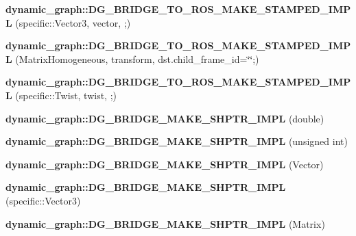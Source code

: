 \begin{DoxyCompactItemize}
{\bfseries dynamic\+\_\+graph\+::\+D\+G\+\_\+\+B\+R\+I\+D\+G\+E\+\_\+\+T\+O\+\_\+\+R\+O\+S\+\_\+\+M\+A\+K\+E\+\_\+\+S\+T\+A\+M\+P\+E\+D\+\_\+\+I\+M\+PL} (specific\+::\+Vector3, vector, ;)
\item 
\mbox{\label{namespacedynamic__graph_a612d5b355619bf2e6aaa3be10d400882}} 
{\bfseries dynamic\+\_\+graph\+::\+D\+G\+\_\+\+B\+R\+I\+D\+G\+E\+\_\+\+T\+O\+\_\+\+R\+O\+S\+\_\+\+M\+A\+K\+E\+\_\+\+S\+T\+A\+M\+P\+E\+D\+\_\+\+I\+M\+PL} (Matrix\+Homogeneous, transform, dst.\+child\+\_\+frame\+\_\+id=\char`\"{}\char`\"{};)
\item 
\mbox{\label{namespacedynamic__graph_a7057c2853072917bd1ff399eccc66bb1}} 
{\bfseries dynamic\+\_\+graph\+::\+D\+G\+\_\+\+B\+R\+I\+D\+G\+E\+\_\+\+T\+O\+\_\+\+R\+O\+S\+\_\+\+M\+A\+K\+E\+\_\+\+S\+T\+A\+M\+P\+E\+D\+\_\+\+I\+M\+PL} (specific\+::\+Twist, twist, ;)
\item 
\mbox{\label{namespacedynamic__graph_ae22a330aece4dccbed6a8e24ac897223}} 
{\bfseries dynamic\+\_\+graph\+::\+D\+G\+\_\+\+B\+R\+I\+D\+G\+E\+\_\+\+M\+A\+K\+E\+\_\+\+S\+H\+P\+T\+R\+\_\+\+I\+M\+PL} (double)
\item 
\mbox{\label{namespacedynamic__graph_a6f98ec6c1978860a339800f794b86c6a}} 
{\bfseries dynamic\+\_\+graph\+::\+D\+G\+\_\+\+B\+R\+I\+D\+G\+E\+\_\+\+M\+A\+K\+E\+\_\+\+S\+H\+P\+T\+R\+\_\+\+I\+M\+PL} (unsigned int)
\item 
\mbox{\label{namespacedynamic__graph_a75a4142b33cde4c86e2bc4b7b410be5a}} 
{\bfseries dynamic\+\_\+graph\+::\+D\+G\+\_\+\+B\+R\+I\+D\+G\+E\+\_\+\+M\+A\+K\+E\+\_\+\+S\+H\+P\+T\+R\+\_\+\+I\+M\+PL} (Vector)
\item 
\mbox{\label{namespacedynamic__graph_a325010454ba7c2835ab21badc5fd1938}} 
{\bfseries dynamic\+\_\+graph\+::\+D\+G\+\_\+\+B\+R\+I\+D\+G\+E\+\_\+\+M\+A\+K\+E\+\_\+\+S\+H\+P\+T\+R\+\_\+\+I\+M\+PL} (specific\+::\+Vector3)
\item 
\mbox{\label{namespacedynamic__graph_a9f8a93a86c41c53460cbe62b1838a12f}} 
{\bfseries dynamic\+\_\+graph\+::\+D\+G\+\_\+\+B\+R\+I\+D\+G\+E\+\_\+\+M\+A\+K\+E\+\_\+\+S\+H\+P\+T\+R\+\_\+\+I\+M\+PL} (Matrix)

\end{DoxyCompactItemize}

